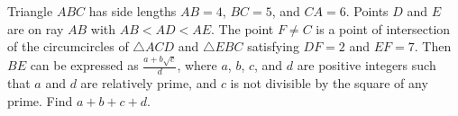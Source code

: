 Triangle $ABC$ has side lengths $AB=4$, $BC=5$, and $CA=6$. Points $D$ and $E$ are on ray $AB$ with $AB<AD<AE$. The point $F\neq C$ is a point of intersection of the circumcircles of $\triangle{ACD}$ and $\triangle{EBC}$ satisfying $DF=2$ and $EF=7$. Then $BE$ can be expressed as $\frac{a+b\sqrt{c}}{d}$, where $a$, $b$, $c$, and $d$ are positive integers such that $a$ and $d$ are relatively prime, and $c$ is not divisible by the square of any prime. Find $a+b+c+d$.